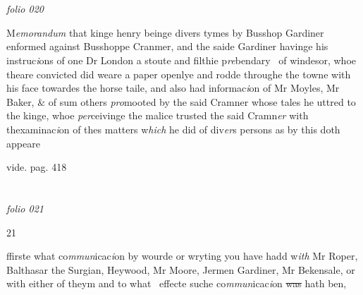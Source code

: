 \documentclass[12pt, a4paper]{book}
\begin{document}
      	
\dotfill
					  \section*{}  \subsection*{}

\textit{folio 020}



            		
            			
		\ifthenelse{\isodd{\thepage}}
		{\reversemarginpar}
		{\normalmarginpar}
		M\textit{emorandum} that kinge henry beinge divers tymes by Busshop Gardiner
            			enformed against Busshoppe Cranmer, and the saide Gardiner
 havinge his instruc\textit{i}ons of one Dr London a stoute and filthie p\textit{re}bendary 
 of windesor, whoe theare convicted did weare a paper openlye
 and rodde throughe the towne with his face towardes the horse
 taile, and also had informac\textit{i}on of Mr Moyles, Mr Baker, \& of
            			sum others \textit{pro}mooted by the said Cramner whose tales he uttred
            			to the kinge, whoe \textit{per}ceivinge the malice trusted the said Cramn\textit{er}
 with thexaminac\textit{i}on of thes matters w\textit{hich} he did of div\textit{er}s persons
 as by this doth appeare

		\ifthenelse{\isodd{\thepage}}
		{\reversemarginpar}
		{\normalmarginpar}
		vide. pag. 418
            		

\dotfill
					  \section*{}  \subsection*{}

\textit{folio 021}


\begin{flushright}
	{\color{Mahogany}21}
\end{flushright}
	
		\ifthenelse{\isodd{\thepage}}
		{\reversemarginpar}
		{\normalmarginpar}
		ffirste what co\textit{mmun}icac\textit{i}on by wourde or wryting you have hadd w\textit{ith}
		Mr Roper, Balthasar the Surgian, Heywood, Mr Moore, Jermen
		Gardiner, Mr Bekensale, or with either of theym and to what 
 effecte suche co\textit{mmun}icac\textit{i}on \sout{was} hath ben,
            		
\end{document}
